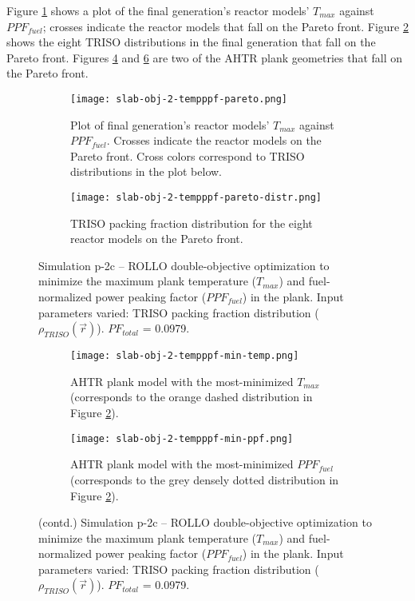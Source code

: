Figure \ref{fig:slab-obj-2-tempppf-pareto} shows a plot of the final generation's 
reactor models' $T_{max}$ against $PPF_{fuel}$; crosses indicate the reactor models that 
fall on the Pareto front.
Figure \ref{fig:slab-obj-2-tempppf-pareto-distr} shows the eight TRISO distributions in 
the final generation that fall on the Pareto front. 
Figures \ref{fig:slab-obj-2-tempppf-min-temp} and \ref{fig:slab-obj-2-tempppf-min-ppf} 
are two of the \gls{AHTR} plank geometries that fall on the Pareto front. 
\begin{figure}[htbp!]
    \centering
    \begin{subfigure}{\textwidth}
        \texttt{[image: slab-obj-2-tempppf-pareto.png]}
        \caption{Plot of final generation's reactor models' $T_{max}$ against 
        $PPF_{fuel}$. Crosses indicate the reactor models on the Pareto front.
        Cross colors correspond to TRISO distributions in the plot below.}
        \label{fig:slab-obj-2-tempppf-pareto} 
    \end{subfigure}
    \begin{subfigure}{\textwidth}
        \texttt{[image: slab-obj-2-tempppf-pareto-distr.png]}
        \caption{TRISO packing fraction distribution for the eight reactor models on the 
        Pareto front.}
        \label{fig:slab-obj-2-tempppf-pareto-distr} 
    \end{subfigure}
    \caption{Simulation p-2c -- ROLLO double-objective optimization to minimize the 
    maximum plank temperature ($T_{max}$) and fuel-normalized power peaking factor 
    ($PPF_{fuel}$) in the plank. 
    Input parameters varied: TRISO packing fraction distribution 
    ($\rho_{TRISO}(\vec{r})$). $PF_{total}$ = 0.0979.}
    \label{fig:slab-obj-2-tempppf}
\end{figure}
\begin{figure}[htbp!]
    \ContinuedFloat
    \begin{subfigure}{\textwidth}
        \texttt{[image: slab-obj-2-tempppf-min-temp.png]}
        \caption{\gls{AHTR} plank model with the most-minimized $T_{max}$
        (corresponds to the orange dashed distribution in Figure 
        \ref{fig:slab-obj-2-tempppf-pareto-distr}).}
        \label{fig:slab-obj-2-tempppf-min-temp} 
    \end{subfigure}
    \begin{subfigure}{\textwidth}
        \texttt{[image: slab-obj-2-tempppf-min-ppf.png]}
        \caption{\gls{AHTR} plank model with the most-minimized $PPF_{fuel}$
        (corresponds to the grey densely dotted distribution in Figure 
        \ref{fig:slab-obj-2-tempppf-pareto-distr}).}
        \label{fig:slab-obj-2-tempppf-min-ppf} 
    \end{subfigure}
    \caption{(contd.) Simulation p-2c -- ROLLO double-objective optimization to minimize 
    the maximum plank temperature ($T_{max}$) and fuel-normalized power peaking factor 
    ($PPF_{fuel}$) in the plank. 
    Input parameters varied: TRISO packing fraction distribution 
    ($\rho_{TRISO}(\vec{r})$). $PF_{total}$ = 0.0979.}
\end{figure}

